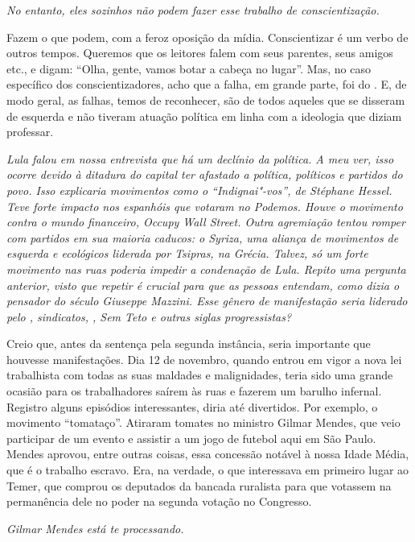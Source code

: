 \itshape
 No entanto, eles sozinhos não podem fazer esse trabalho
de conscientização.

\normalfont
Fazem o que podem, com a feroz oposição da mídia.
Conscientizar é um verbo de outros tempos. Queremos que os leitores
falem com seus parentes, seus amigos etc., e digam: ``Olha, gente, vamos
botar a cabeça no lugar''. Mas, no caso específico dos
conscientizadores, acho que a falha, em grande parte, foi do . E, de
modo geral, as falhas, temos de reconhecer, são de todos aqueles que se
disseram de esquerda e não tiveram atuação política em linha com a
ideologia que diziam professar.

\itshape
 Lula falou em nossa entrevista que há um declínio da
política. A meu ver, isso ocorre devido à ditadura do capital ter
afastado a política, políticos e partidos do povo. Isso explicaria
movimentos como o ``Indignai"-vos'', de Stéphane Hessel. Teve forte
impacto nos espanhóis que votaram no Podemos. Houve o movimento contra o
mundo financeiro, Occupy Wall Street. Outra agremiação tentou romper com
partidos em sua maioria caducos: o Syriza, uma aliança de movimentos de
esquerda e ecológicos liderada por Tsipras, na Grécia. Talvez, só um
forte movimento nas ruas poderia impedir a condenação de Lula. Repito
uma pergunta anterior, visto que repetir é crucial para que as pessoas
entendam, como dizia o pensador do século  Giuseppe Mazzini. Esse
gênero de manifestação seria liderado pelo , sindicatos, , Sem Teto
e outras siglas progressistas?

\normalfont
Creio que, antes da sentença pela segunda instância,
seria importante que houvesse manifestações. Dia 12 de novembro, quando
entrou em vigor a nova lei trabalhista com todas as suas maldades e
malignidades, teria sido uma grande ocasião para os trabalhadores saírem
às ruas e fazerem um barulho infernal. Registro alguns episódios
interessantes, diria até divertidos. Por exemplo, o movimento
``tomataço''. Atiraram tomates no ministro Gilmar Mendes, que veio
participar de um evento e assistir a um jogo de futebol aqui em São
Paulo. Mendes aprovou, entre outras coisas, essa concessão notável à
nossa Idade Média, que é o trabalho escravo. Era, na verdade, o que
interessava em primeiro lugar ao Temer, que comprou os deputados da
bancada ruralista para que votassem na permanência dele no poder na
segunda votação no Congresso.

\itshape
 Gilmar Mendes está te processando.

